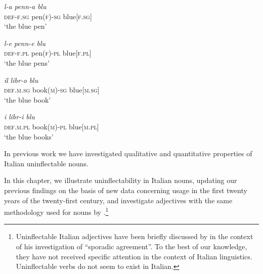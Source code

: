 \documentclass[output=paper,colorlinks,citecolor=brown]{langscibook}
\begin{document}
\begin{exe}
	\ex \label{10ex2}
	\begin{xlist}
		\ex 
		\gll \emph{l-a} \emph{penn-a} \emph{blu} \\
		\textsc{def-f.sg} pen(\textsc{f})-\textsc{sg} blue[\textsc{f.sg}] \\
		\trans ‘the blue pen’
		
		\ex 
		\gll \emph{l-e} \emph{penn-e} \emph{blu} \\
		\textsc{def-f.pl} pen(\textsc{f})-\textsc{pl} blue[\textsc{f.pl}] \\
		\trans ‘the blue pens’
		
		\ex 
		\gll \emph{il} \emph{libr-o} \emph{blu} \\
		\textsc{def.m.sg} book(\textsc{m})-\textsc{sg} blue[\textsc{m.sg}] \\
		\trans ‘the blue book’
		
		\ex 
		\gll \emph{i} \emph{libr-i} \emph{blu} \\
		\textsc{def.m.pl} book(\textsc{m})-\textsc{pl} blue[\textsc{m.pl}] \\
		\trans ‘the blue books’
	\end{xlist}
\end{exe}

{\sloppy In previous work \citep{dresslerthornton1996, dachillethornton2003, dachille2005-sullinvari, dachillethornton2008} we have investigated qualitative and quantitative properties of Italian uninflectable nouns.\par}

In this chapter, we illustrate uninflectability in Italian nouns, updating our previous findings on the basis of new data concerning usage in the first twenty years of the twenty-first century, and investigate adjectives with the same methodology used for nouns by \citet{dachillethornton2003}.\footnote{Uninflectable Italian adjectives have been briefly discussed by \citet{fedden2019} in the context of his investigation of ``sporadic agreement''. To the best of our knowledge, they have not received specific attention in the context of Italian linguistics. Uninflectable verbs do not seem to exist in Italian.}
\end{document}
